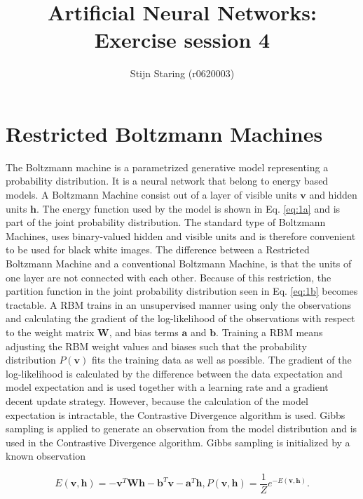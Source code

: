 \documentclass[a4paper,10pt]{article}
\title{Artificial Neural Networks: Exercise session 4}
\author{Stijn Staring (r0620003)}
\begin{document}
\selectfont{}

\maketitle


\section{Restricted Boltzmann Machines}
The Boltzmann machine is a parametrized generative model representing a probability distribution. It is a neural network that belong to energy based models. A Boltzmann Machine consist out of a layer of visible units $ \bm{v} $ and hidden units $ \bm{h} $. The energy function used by the model is shown in Eq. \ref{eq:1a} and is part of the joint probability distribution. The standard type of Boltzmann Machines, uses binary-valued hidden and visible units and is therefore convenient to be used for black white images. The difference between a Restricted Boltzmann Machine and a conventional  Boltzmann Machine, is that the units of one layer are not connected with each other. Because of this restriction, the partition function in the joint probability distribution seen in Eq. \ref{eq:1b} becomes tractable. A RBM trains in an unsupervised manner using only the observations and calculating the gradient of the log-likelihood of the observations with respect to the weight matrix $ \bm{W} $, and bias terms $ \bm{a} $ and $ \bm{b} $. Training a RBM means adjusting the RBM weight values and  biases such that the probability distribution $ P(\bm{v}) $ fits the training data as well as possible. The gradient of the log-likelihood is calculated by the difference between the data expectation and model expectation and is used together with a learning rate and a gradient decent update strategy. However, because the calculation of the model expectation is intractable, the Contrastive Divergence algorithm is used. Gibbs sampling is applied to generate an observation from the model distribution and is used in the Contrastive Divergence algorithm. Gibbs sampling is initialized by a known observation

\begin{subequations}
	\begin{equation}\label{eq:1a}
		E(\bm{v},\bm{h}) = -\bm{v}^T\bm{W}\bm{h} - \bm{b}^T\bm{v}-\bm{a}^T\bm{h},
	\end{equation}
	\begin{equation}\label{eq:1b}
		P(\bm{v},\bm{h}) = \frac{1}{Z}e^{-E(\bm{v},\bm{h})}    .
	\end{equation}
	\label{eq:1}
\end{subequations}
\end{document}
